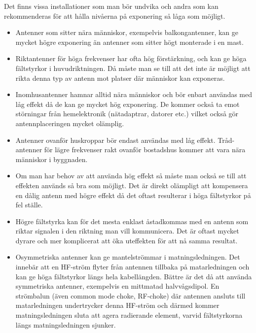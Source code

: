 Det finns vissa installationer som man bör undvika och andra som kan
rekommenderas för att hålla nivåerna på exponering så låga som möjligt.

\begin{itemize}
	\item Antenner som sitter nära människor, exempelvis balkongantenner, kan ge
	mycket högre exponering än antenner som sitter högt monterade i en mast.
	
	\item Riktantenner för höga frekvenser har ofta hög förstärkning, och
	kan ge höga fältstyrkor i huvudriktningen.
	Då måste man se till att det inte är möjligt att rikta denna typ av antenn
	mot platser där människor kan exponeras.
	
	\item Inomhusantenner hamnar alltid nära människor och bör enbart användas med
	låg effekt då de kan ge mycket hög exponering.
	De kommer också ta emot störningar från hemelektronik (nätadaptrar, datorer
	etc.) vilket också gör antennplaceringen mycket olämplig.
	
	\item Antenner ovanför huskroppar bör endast användas med låg effekt.
	Tråd-antenner för lägre frekvenser rakt ovanför bostadshus kommer att
	vara nära människor i byggnaden.
	
	\item Om man har behov av att använda hög effekt så måste man också se
	till att effekten används så bra som möjligt.
	Det är direkt olämpligt att kompensera en dålig antenn med högre effekt då
	det oftast resulterar i höga fältstyrkor på fel ställe.
	
	\item Högre fältstyrka kan för det mesta enklast åstadkommas med en
	antenn som riktar signalen i den riktning man vill kommunicera.
	Det är oftast mycket dyrare och mer komplicerat att öka uteffekten för att nå
	samma resultat.
	
	\item Osymmetriska antenner kan ge mantelströmmar i matningsledningen.
	Det innebär att en HF-ström flyter från antennen tillbaka på matarledningen
	och kan ge höga fältstyrkor längs hela kabellängden.
	Bättre är det då att använda symmetriska antenner, exempelvis en mittmatad
	halvvågsdipol.
	En strömbalun (även common mode choke, RF-choke) där antennen ansluts till
	matarledningen undertrycker denna HF-ström och därmed kommer
	matningsledningen sluta att agera radierande element, varvid fältstyrkorna
	längs matningsledningen sjunker.
	

\end{itemize}
